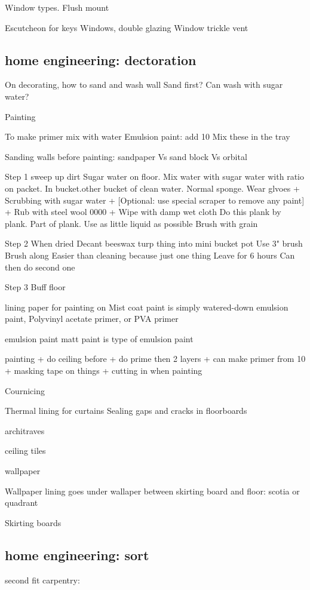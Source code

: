 Window types. Flush mount

Escutcheon for keys
Windows, double glazing
Window trickle vent

\subsection{home engineering: dectoration}
On decorating, how to sand and wash wall
Sand first?
Can wash with sugar water?

Painting

To make primer mix with water
Emulsion paint: add 10%
Mix these in the tray

Sanding walls before painting: sandpaper Vs sand block Vs orbital

Step 1 sweep up dirt
Sugar water on floor. Mix water with sugar water with ratio on packet. In bucket.other bucket of clean water. Normal sponge. Wear glvoes
+ Scrubbing with sugar water
+ [Optional: use special scraper to remove any paint]
+ Rub with steel wool 0000
+ Wipe with damp wet cloth
Do this plank by plank. Part of plank.
Use as little liquid as possible
Brush with grain

Step 2 When dried
Decant beeswax turp thing into mini bucket pot
Use 3" brush
Brush along
Easier than cleaning because just one thing
Leave for 6 hours
Can then do second one

Step 3 Buff floor

lining paper for painting on
Mist coat paint is simply watered-down emulsion paint,
Polyvinyl acetate primer, or PVA primer

emulsion paint
	matt paint is type of emulsion paint


painting
+ do ceiling before
+ do prime then 2 layers
+ can make primer from 10%
+ masking tape on things
+ cutting in when painting

Cournicing

Thermal lining for curtains
Sealing gaps and cracks in floorboards

architraves

ceiling tiles

wallpaper

Wallpaper lining goes under wallaper
between skirting board and floor: scotia or quadrant

Skirting boards
\subsection{home engineering: sort}
second fit carpentry:

